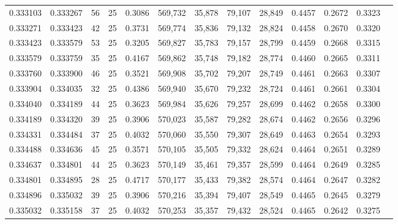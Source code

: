 \begin{tabular}{rrrrrrrrrrrrr}
0.333103 & 0.333267 &    56 &  25 &                                     0.3086 & 569,732 &  35,878 &  79,107 &  28,849 & 0.4457 & 0.2672 & 0.3323 \\
0.333271 & 0.333423 &    42 &  25 &                                     0.3731 & 569,774 &  35,836 &  79,132 &  28,824 & 0.4458 & 0.2670 & 0.3320 \\
0.333423 & 0.333579 &    53 &  25 &                                     0.3205 & 569,827 &  35,783 &  79,157 &  28,799 & 0.4459 & 0.2668 & 0.3315 \\
0.333579 & 0.333759 &    35 &  25 &                                     0.4167 & 569,862 &  35,748 &  79,182 &  28,774 & 0.4460 & 0.2665 & 0.3311 \\
0.333760 & 0.333900 &    46 &  25 &                                     0.3521 & 569,908 &  35,702 &  79,207 &  28,749 & 0.4461 & 0.2663 & 0.3307 \\
0.333904 & 0.334035 &    32 &  25 &                                     0.4386 & 569,940 &  35,670 &  79,232 &  28,724 & 0.4461 & 0.2661 & 0.3304 \\
0.334040 & 0.334189 &    44 &  25 &                                     0.3623 & 569,984 &  35,626 &  79,257 &  28,699 & 0.4462 & 0.2658 & 0.3300 \\
0.334189 & 0.334320 &    39 &  25 &                                     0.3906 & 570,023 &  35,587 &  79,282 &  28,674 & 0.4462 & 0.2656 & 0.3296 \\
0.334331 & 0.334484 &    37 &  25 &                                     0.4032 & 570,060 &  35,550 &  79,307 &  28,649 & 0.4463 & 0.2654 & 0.3293 \\
0.334488 & 0.334636 &    45 &  25 &                                     0.3571 & 570,105 &  35,505 &  79,332 &  28,624 & 0.4464 & 0.2651 & 0.3289 \\
0.334637 & 0.334801 &    44 &  25 &                                     0.3623 & 570,149 &  35,461 &  79,357 &  28,599 & 0.4464 & 0.2649 & 0.3285 \\
0.334801 & 0.334895 &    28 &  25 &                                     0.4717 & 570,177 &  35,433 &  79,382 &  28,574 & 0.4464 & 0.2647 & 0.3282 \\
0.334896 & 0.335032 &    39 &  25 &                                     0.3906 & 570,216 &  35,394 &  79,407 &  28,549 & 0.4465 & 0.2645 & 0.3279 \\
0.335032 & 0.335158 &    37 &  25 &                                     0.4032 & 570,253 &  35,357 &  79,432 &  28,524 & 0.4465 & 0.2642 & 0.3275 \\

\end{tabular}
